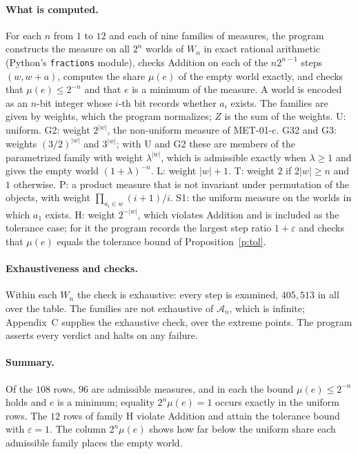 \documentclass{situationist-preprint}
\begin{document}
\paragraph{What is computed.} For each $n$ from $1$ to $12$ and each of nine families of measures, the program constructs the measure on all $2^n$ worlds of $W_n$ in exact rational arithmetic (Python's \texttt{fractions} module), checks Addition on each of the $n 2^{n-1}$ steps $(w, w+a)$, computes the share $\mu(e)$ of the empty world exactly, and checks that $\mu(e) \leq 2^{-n}$ and that $e$ is a minimum of the measure. A world is encoded as an $n$-bit integer whose $i$-th bit records whether $a_i$ exists. The families are given by weights, which the program normalizes; $Z$ is the sum of the weights. U: uniform. G2: weight $2^{|w|}$, the non-uniform measure of MET-01-c. G32 and G3: weights $(3/2)^{|w|}$ and $3^{|w|}$; with U and G2 these are members of the parametrized family with weight $\lambda^{|w|}$, which is admissible exactly when $\lambda \geq 1$ and gives the empty world $(1+\lambda)^{-n}$. L: weight $|w| + 1$. T: weight $2$ if $2|w| \geq n$ and $1$ otherwise. P: a product measure that is not invariant under permutation of the objects, with weight $\prod_{a_i \in w} (i+1)/i$. S1: the uniform measure on the worlds in which $a_1$ exists. H: weight $2^{-|w|}$, which violates Addition and is included as the tolerance case; for it the program records the largest step ratio $1+\varepsilon$ and checks that $\mu(e)$ equals the tolerance bound of Proposition~\ref{p:tol}.

\paragraph{Exhaustiveness and checks.} Within each $W_n$ the check is exhaustive: every step is examined, $405{,}513$ in all over the table. The families are not exhaustive of $\mathcal{A}_n$, which is infinite; Appendix~C supplies the exhaustive check, over the extreme points. The program asserts every verdict and halts on any failure.

\paragraph{Summary.} Of the $108$ rows, $96$ are admissible measures, and in each the bound $\mu(e) \leq 2^{-n}$ holds and $e$ is a minimum; equality $2^n\mu(e) = 1$ occurs exactly in the uniform rows. The $12$ rows of family H violate Addition and attain the tolerance bound with $\varepsilon = 1$. The column $2^n\mu(e)$ shows how far below the uniform share each admissible family places the empty world.
\end{document}
